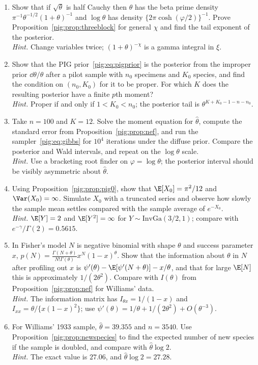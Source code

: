\begin{enumerate}[label=\arabic*.,ref=\arabic*,leftmargin=*]
\item Show that if $\sqrt\theta$ is half Cauchy then $\theta$ has the beta prime density $\pi^{-1}\theta^{-1/2}(1+\theta)^{-1}$ and $\log\theta$ has density $\{2\pi\cosh(\varphi/2)\}^{-1}$. Prove Proposition~\ref{pig:prop:threeblock} for general $\chi$ and find the tail exponent of the posterior.\\
\emph{Hint.} Change variables twice; $(1+\theta)^{-\chi}$ is a gamma integral in $\xi$.

\item Show that the PIG prior~\eqref{pig:eq:pigprior} is the posterior from the improper prior $\dd\theta/\theta$ after a pilot sample with $n_0$ specimens and $K_0$ species, and find the condition on $(n_0,K_0)$ for it to be proper. For which $K$ does the resulting posterior have a finite $p$th moment?\\
\emph{Hint.} Proper if and only if $1<K_0<n_0$; the posterior tail is $\theta^{K+K_0-1-n-n_0}$.

\item Take $n=100$ and $K=12$. Solve the moment equation for $\hat\theta$, compute the standard error from Proposition~\ref{pig:prop:nef}, and run the sampler~\eqref{pig:eq:gibbs} for $10^4$ iterations under the diffuse prior. Compare the posterior and Wald intervals, and repeat on the $\log\theta$ scale.\\
\emph{Hint.} Use a bracketing root finder on $\varphi=\log\theta$; the posterior interval should be visibly asymmetric about $\hat\theta$.

\item Using Proposition~\ref{pig:prop:pig0}, show that $\E[X_0]=\pi^2/12$ and $\Var(X_0)=\infty$. Simulate $X_0$ with a truncated series and observe how slowly the sample mean settles compared with the sample average of $e^{-X_0}$.\\
\emph{Hint.} $\E[Y]=2$ and $\E[Y^2]=\infty$ for $Y\sim\mathrm{InvGa}(3/2,1)$; compare with $e^{-\gamma}/\Gamma(2)=0.5615$.

\item\label{pig:exr:ancillary} In Fisher's model $N$ is negative binomial with shape $\theta$ and success parameter $x$, $p(N)=\frac{\Gamma(N+\theta)}{N!\Gamma(\theta)}x^N(1-x)^\theta$. Show that the information about $\theta$ in $N$ after profiling out $x$ is $\psi'(\theta)-\E[\psi'(N+\theta)]-x/\theta$, and that for large $\E[N]$ this is approximately $1/(2\theta^2)$. Compare with $I(\theta)$ from Proposition~\ref{pig:prop:nef} for Williams' data.\\
\emph{Hint.} The information matrix has $I_{\theta x}=1/(1-x)$ and $I_{xx}=\theta/\{x(1-x)^2\}$; use $\psi'(\theta)=1/\theta+1/(2\theta^2)+O(\theta^{-3})$.

\item For Williams' 1933 sample, $\hat\theta=39.355$ and $n=3540$. Use Proposition~\ref{pig:prop:newspecies} to find the expected number of new species if the sample is doubled, and compare with $\hat\theta\log2$.\\
\emph{Hint.} The exact value is $27.06$, and $\hat\theta\log2=27.28$.
\end{enumerate}

